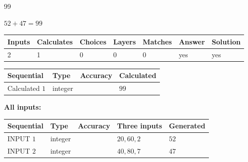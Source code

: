 \documentclass[12pt]{article}
\begin{document}
\noindent{}
 
 

99
 
 
\noindent{}
 
 

 
 
 
\noindent{}
 
 

$ %
52 +  %
47=   %
99$
 
 
\noindent{}
 
 

 
   
   
   
   
\noindent\begin{tabular}{|l|l|l|l|l|l|l|}
 \hline
Inputs & Calculates & Choices & Layers & Matches & Answer & Solution \\ \hline
 2  & 
 1  & 
 0
  & 
 0  & 
 0  & 
  yes & 
  yes 
  \\ \hline
 \end{tabular}
   
   
   
   
\noindent{}
   
   
  
  
\noindent\begin{tabular}{|l|l|l|l|}
\hline
 Sequential & Type & Accuracy & Calculated \\ 
\hline
 
 
  Calculated $  1 $ & integer &  & 
  $ 99 $ 
 \\  \hline  
 \end{tabular}
   
   
   
   
\noindent\vspace{0.1in}\hspace{-0.08in} {\textbf{\Large{All inputs: }}}
   
   
  
  
\noindent\begin{tabular}{|l|l|l|l|l|}
\hline
 Sequential & Type & Accuracy & Three inputs & Generated \\ 
\hline
 
 
  INPUT $  1 $ & integer &  & $
 20
 , 
 60
 , 
 2
 $ & $ 52 $ 
 \\  \hline  
 
 
  INPUT $  2 $ & integer &  & $
 40
 , 
 80
 , 
 7
 $ & $ 47 $ 
 \\  \hline  
 \end{tabular}
   
\end{document}
